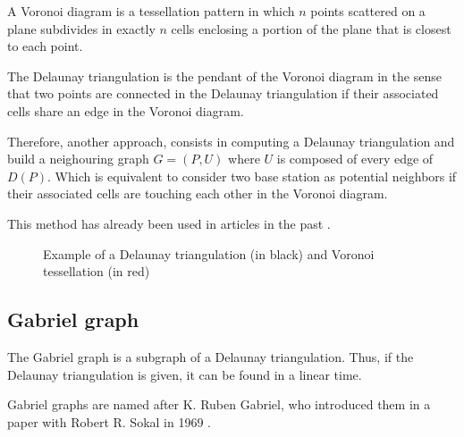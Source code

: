 \documentclass[lettersize,journal,english]{IEEEtran}
\begin{document}
A Voronoi diagram is a tessellation pattern in which $n$ points scattered on a plane subdivides in 
exactly $n$ cells enclosing a portion of the plane that is closest to each point. 

The Delaunay triangulation is the pendant of the Voronoi diagram in the sense that two points are connected in the
Delaunay triangulation if their associated cells share an edge in the Voronoi diagram. 

Therefore, another approach, consists in computing a Delaunay triangulation and build a neighouring graph $G = (P, U)$ where $U$ 
is composed of every edge of $D(P)$. Which is equivalent to consider two base station as potential neighbors if their associated
cells are touching each other in the Voronoi diagram.

This method has already been used in articles in the past \cite{delaunay_neighbor}.


\begin{figure}[!t]
    \centering
    \caption{Example of a Delaunay triangulation (in black) and Voronoi tessellation (in red)}
    \label{fig:del_tri}
\end{figure}

\subsection{Gabriel graph}
\noindent The Gabriel graph is a subgraph of a Delaunay triangulation. Thus, if the Delaunay triangulation is given, it can be found in a linear time. 

Gabriel graphs are named after K. Ruben Gabriel, who introduced them in a paper with Robert R. Sokal in 1969 \cite{10.2307/2412323}.
\end{document}
